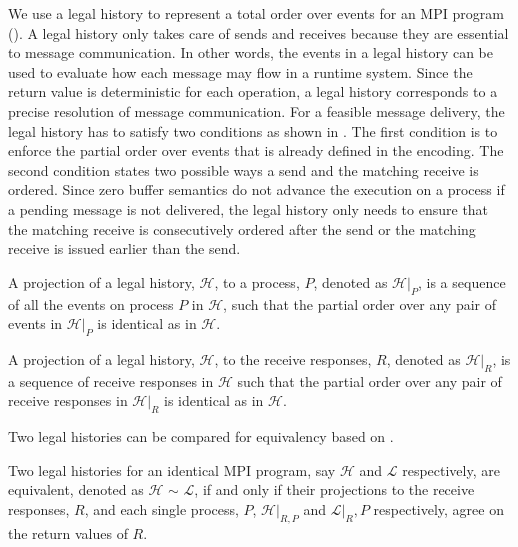 We use a legal history to represent a total order over events for an MPI program (). A legal history only takes care of sends and receives because they are essential to message communication. In other words, the events in a legal history can be used to evaluate how each message may flow in a runtime system. Since the return value is deterministic for each operation, a legal history corresponds to a precise resolution of message communication. For a feasible message delivery, the legal history has to satisfy two conditions as shown in . The first condition is to enforce the partial order over events that is already defined in the encoding. The second condition states two possible ways a send and the matching receive is ordered. Since zero buffer semantics do not advance the execution on a process if a pending message is not delivered, the legal history only needs to ensure that the matching receive is consecutively ordered after the send or the matching receive is issued earlier than the send. 


\begin{definition}\label{def:projection_process}
A projection of a legal history, $\mathcal{H}$, to a process, $P$, denoted as $\mathcal{H} | _P$, is a sequence of all the events on process $P$ in $\mathcal{H}$, such that the partial order over any pair of events in $\mathcal{H} | _P$ is identical as in $\mathcal{H}$.
\end{definition}

\begin{definition}\label{def:projection_receive}
A projection of a legal history, $\mathcal{H}$, to the receive responses, $R$, denoted as $\mathcal{H} | _R$, is a sequence of receive responses in $\mathcal{H}$ such that the partial order over any pair of receive responses in $\mathcal{H} | _R$ is identical as in $\mathcal{H}$.
\end{definition}

Two legal histories can be compared for equivalency based on .  

\begin{definition}\label{def:er}
Two legal histories for an identical MPI program, say $\mathcal{H}$ and $\mathcal{L}$ respectively, are equivalent, denoted as $\mathcal{H}$ $\sim$ $\mathcal{L}$, if and only if their projections to the receive responses, $R$, and each single process, $P$, $\mathcal{H} | _{R,P}$ and $\mathcal{L} | _R,P$ respectively, agree on the return values of $R$.
\end{definition}

